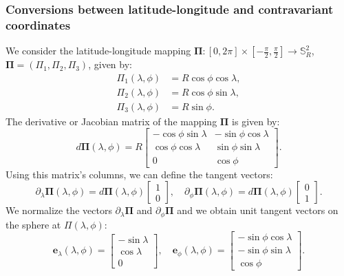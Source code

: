 \subsubsection{Conversions between latitude-longitude and contravariant coordinates}
\label{anexo-sph-ll}
We consider the latitude-longitude mapping 
$\boldsymbol{\Pi}: [0,2\pi] \times [-\frac{\pi}{2},\frac{\pi}{2}] \to \mathbb{S}^2_R$, 
$\boldsymbol{\Pi} = ({\Pi}_1,{\Pi}_2,{\Pi}_3)$, given by:
\begin{align}
	\label{ll2sph}
	{\Pi}_1(\lambda,\phi) &= R\cos \phi \cos \lambda,\\
	{\Pi}_2(\lambda,\phi) &= R\cos \phi \sin \lambda,\\
	{\Pi}_3(\lambda,\phi) &= R\sin \phi.
\end{align}
The derivative or Jacobian matrix of the mapping $\boldsymbol{\Pi}$ is given by:
\begin{equation}
	\label{dGamma}
	d\boldsymbol{\Pi} (\lambda,\phi) = 
	R \begin{bmatrix}
		-\cos \phi \sin \lambda &  -\sin \phi \cos \lambda \\
		\cos \phi \cos \lambda & \sin \phi \sin \lambda \\
		0  &  \cos \phi
	\end{bmatrix}.
\end{equation}
Using this matrix's columns, we can define the tangent vectors:
\begin{equation}
	\partial_{\lambda}\boldsymbol{\Pi}(\lambda,\phi) = d\boldsymbol{\Pi}(\lambda,\phi)
	\begin{bmatrix}
		1 \\
		0
	\end{bmatrix}, \quad
	\partial_{\phi}\boldsymbol{\Pi}(\lambda,\phi) = d\boldsymbol{\Pi}(\lambda,\phi)
	\begin{bmatrix}
		0 \\
		1
	\end{bmatrix}.
\end{equation}
We normalize the vectors $\partial_{\lambda}\boldsymbol{\Pi}$ and $\partial_{\phi}\boldsymbol{\Pi}$
and we obtain unit tangent vectors on the sphere at $\Pi(\lambda, \phi)$:
\begin{equation}
	\label{latlon_tg_vectors}
	\boldsymbol{e}_{\lambda}(\lambda,\phi) = 
	\begin{bmatrix}
		-\sin \lambda \\
		\cos \lambda \\
		0
	\end{bmatrix}, \quad
	\boldsymbol{e}_{\phi}(\lambda,\phi) =
	\begin{bmatrix}
		-\sin \phi \cos \lambda \\
		-\sin \phi \sin \lambda \\
		\cos \phi
	\end{bmatrix}.
\end{equation}
